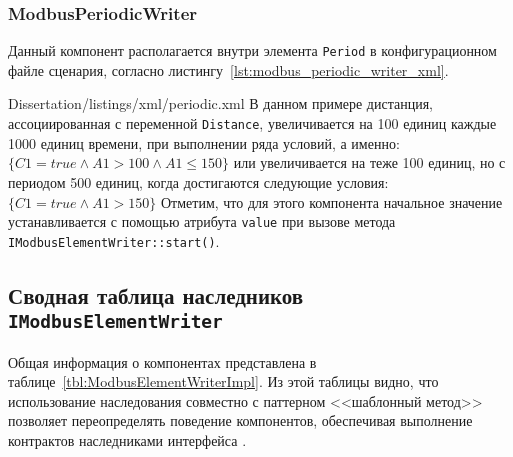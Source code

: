 \subsubsection{ModbusPeriodicWriter}
Данный компонент располагается внутри элемента \texttt{Period} в конфигурационном файле сценария,
согласно листингу~\ref{lst:modbus_periodic_writer_xml}.

        {Dissertation/listings/xml/periodic.xml}
В данном примере дистанция, ассоциированная с переменной \texttt{Distance}, увеличивается на 100 единиц каждые 1000 единиц времени,
при выполнении ряда условий, а именно: $\{C1 = true \wedge A1 > 100 \wedge A1 \le 150 \}$ или
увеличивается на теже 100 единиц, но с периодом 500 единиц, когда достигаются следующие условия:
$\{C1 = true \wedge A1 > 150\}$
Отметим, что для этого компонента начальное значение устанавливается с помощью атрибута \texttt{value}
при вызове метода \texttt{IModbusElementWriter::start()}.


\subsection{Сводная таблица наследников \texttt{IModbusElementWriter}}
Общая информация о компонентах представлена в таблице~\ref{tbl:ModbusElementWriterImpl}.
Из этой таблицы видно, что использование наследования совместно с паттерном <<шаблонный метод>>
позволяет переопределять поведение компонентов, обеспечивая выполнение контрактов наследниками интерфейса
\cite[стр. 124-125]{book:oop:oop_analize,bib:my:ttd_with_patterns_2019}.

